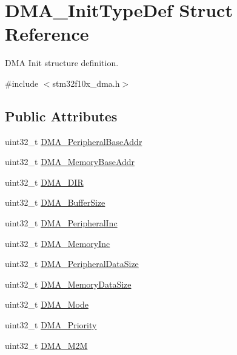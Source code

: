 \hypertarget{struct_d_m_a___init_type_def}{}\section{D\+M\+A\+\_\+\+Init\+Type\+Def Struct Reference}
\label{struct_d_m_a___init_type_def}


D\+MA Init structure definition.  




{\ttfamily \#include $<$stm32f10x\+\_\+dma.\+h$>$}

\subsection*{Public Attributes}
\begin{DoxyCompactItemize}
\item 
uint32\+\_\+t \hyperlink{struct_d_m_a___init_type_def_a232af556de7c2eec9a82d448730bd86d}{D\+M\+A\+\_\+\+Peripheral\+Base\+Addr}
\item 
uint32\+\_\+t \hyperlink{struct_d_m_a___init_type_def_a41e7d463f0cfbcedf3170d7d27d088df}{D\+M\+A\+\_\+\+Memory\+Base\+Addr}
\item 
uint32\+\_\+t \hyperlink{struct_d_m_a___init_type_def_a91b47435ccf4a40efa97bbbe631789e1}{D\+M\+A\+\_\+\+D\+IR}
\item 
uint32\+\_\+t \hyperlink{struct_d_m_a___init_type_def_a999df57215b28b3b1b3b6836c4952ca5}{D\+M\+A\+\_\+\+Buffer\+Size}
\item 
uint32\+\_\+t \hyperlink{struct_d_m_a___init_type_def_ad4d427790f9a089ca0257a358fc263c2}{D\+M\+A\+\_\+\+Peripheral\+Inc}
\item 
uint32\+\_\+t \hyperlink{struct_d_m_a___init_type_def_aaf69c680a297ec01a2ed613289e691a1}{D\+M\+A\+\_\+\+Memory\+Inc}
\item 
uint32\+\_\+t \hyperlink{struct_d_m_a___init_type_def_afb46aaadfb80a7e19277c868bd252554}{D\+M\+A\+\_\+\+Peripheral\+Data\+Size}
\item 
uint32\+\_\+t \hyperlink{struct_d_m_a___init_type_def_a74bb71921c4d198d6cf1979c120f694f}{D\+M\+A\+\_\+\+Memory\+Data\+Size}
\item 
uint32\+\_\+t \hyperlink{struct_d_m_a___init_type_def_a8adbe6f3e46471d109afaa3111dce220}{D\+M\+A\+\_\+\+Mode}
\item 
uint32\+\_\+t \hyperlink{struct_d_m_a___init_type_def_ab9a17bd51778478cbd728c868206dca0}{D\+M\+A\+\_\+\+Priority}
\item 
uint32\+\_\+t \hyperlink{struct_d_m_a___init_type_def_a57944cc447e6fcde4e9aa6229d3b4c5d}{D\+M\+A\+\_\+\+M2M}
\end{DoxyCompactItemize}



